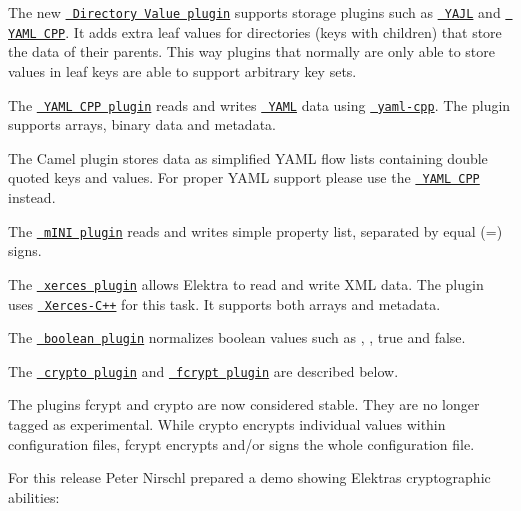 \begin{DoxyItemize}
\item The new \href{https://www.libelektra.org/plugins/directoryvalue}{\texttt{ Directory Value plugin}} supports storage plugins such as \href{https://www.libelektra.org/plugins/yajl}{\texttt{ Y\+A\+JL}} and \href{https://www.libelektra.org/plugins/yamlcpp}{\texttt{ Y\+A\+ML C\+PP}}. It adds extra leaf values for directories (keys with children) that store the data of their parents. This way plugins that normally are only able to store values in leaf keys are able to support arbitrary key sets.
\item The \href{https://www.libelektra.org/plugins/yamlcpp}{\texttt{ Y\+A\+ML C\+PP plugin}} reads and writes \href{http://yaml.org}{\texttt{ Y\+A\+ML}} data using \href{https://github.com/jbeder/yaml-cpp}{\texttt{ yaml-\/cpp}}. The plugin supports arrays, binary data and metadata.
\item The Camel plugin stores data as simplified Y\+A\+ML flow lists containing double quoted keys and values. For proper Y\+A\+ML support please use the \href{https://www.libelektra.org/plugins/yamlcpp}{\texttt{ Y\+A\+ML C\+PP}} instead.
\item The \href{https://www.libelektra.org/plugins/mini}{\texttt{ m\+I\+NI plugin}} reads and writes simple property list, separated by equal ({\ttfamily =}) signs.
\item The \href{https://www.libelektra.org/plugins/xerces}{\texttt{ xerces plugin}} allows Elektra to read and write X\+ML data. The plugin uses \href{http://xerces.apache.org/xerces-c}{\texttt{ Xerces-\/\+C++}} for this task. It supports both arrays and metadata.
\item The \href{https://www.libelektra.org/plugins/boolean}{\texttt{ boolean plugin}} normalizes boolean values such as {}, {}, {\ttfamily true} and {\ttfamily false}.
\item The \href{https://www.libelektra.org/plugins/crypto}{\texttt{ crypto plugin}} and \href{https://www.libelektra.org/plugins/fcrypt}{\texttt{ fcrypt plugin}} are described below.
\end{DoxyItemize}

The plugins {\ttfamily fcrypt} and {\ttfamily crypto} are now considered stable. They are no longer tagged as {\ttfamily experimental}. While {\ttfamily crypto} encrypts individual values within configuration files, {\ttfamily fcrypt} encrypts and/or signs the whole configuration file.

For this release Peter Nirschl prepared a demo showing Elektra\textquotesingle{}s cryptographic abilities\+:

